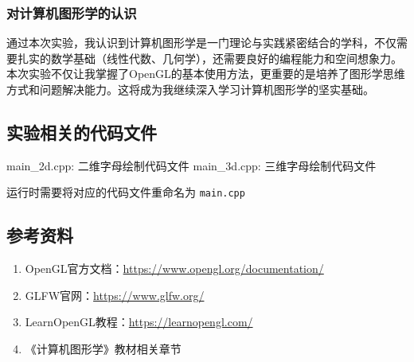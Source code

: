 \documentclass[a4paper]{article}
\begin{document}
\subsubsection{对计算机图形学的认识}

通过本次实验，我认识到计算机图形学是一门理论与实践紧密结合的学科，不仅需要扎实的数学基础（线性代数、几何学），还需要良好的编程能力和空间想象力。本次实验不仅让我掌握了OpenGL的基本使用方法，更重要的是培养了图形学思维方式和问题解决能力。这将成为我继续深入学习计算机图形学的坚实基础。

\subsection{实验相关的代码文件}
main\_2d.cpp: 二维字母绘制代码文件  
main\_3d.cpp: 三维字母绘制代码文件

\begin{tcolorbox}[colback=yellow!10!white, colframe=orange!75!black, title=\textbf{注意}]
运行时需要将对应的代码文件重命名为 \texttt{main.cpp}
\end{tcolorbox}

\subsection{参考资料}

\begin{enumerate}
    \item OpenGL官方文档：\url{https://www.opengl.org/documentation/}
    \item GLFW官网：\url{https://www.glfw.org/}
    \item LearnOpenGL教程：\url{https://learnopengl.com/}
    \item 《计算机图形学》教材相关章节
\end{enumerate}
\end{document}
